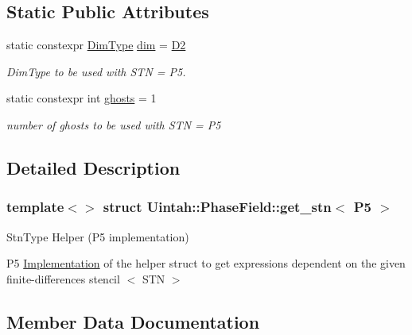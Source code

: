 \subsection*{Static Public Attributes}
\begin{DoxyCompactItemize}
\item 
static constexpr \hyperlink{namespaceUintah_1_1PhaseField_a12bfc68444894dffdf0cb8d9cf0cc76a}{Dim\+Type} \hyperlink{structUintah_1_1PhaseField_1_1get__stn_3_01P5_01_4_a937eed44e6e31e1a618644b54996e90f}{dim} = \hyperlink{namespaceUintah_1_1PhaseField_a12bfc68444894dffdf0cb8d9cf0cc76aa1a451dae278b0103a94105c8776e9a67}{D2}
\begin{DoxyCompactList}\small\item\em Dim\+Type to be used with S\+TN = P5. \end{DoxyCompactList}\item 
static constexpr int \hyperlink{structUintah_1_1PhaseField_1_1get__stn_3_01P5_01_4_abdc172a7101506a5fc7fa3e5860c5350}{ghosts} = 1
\begin{DoxyCompactList}\small\item\em number of ghosts to be used with S\+TN = P5 \end{DoxyCompactList}\end{DoxyCompactItemize}


\subsection{Detailed Description}
\subsubsection*{template$<$$>$\newline
struct Uintah\+::\+Phase\+Field\+::get\+\_\+stn$<$ P5 $>$}

Stn\+Type Helper (P5 implementation) 

P5 \hyperlink{classUintah_1_1PhaseField_1_1Implementation}{Implementation} of the helper struct to get expressions dependent on the given finite-\/differences stencil $<$ S\+TN $>$ 

\subsection{Member Data Documentation}
\mbox{\label{structUintah_1_1PhaseField_1_1get__stn_3_01P5_01_4_a937eed44e6e31e1a618644b54996e90f}} 
